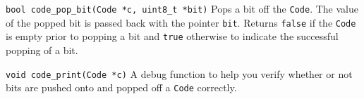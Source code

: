 \begin{funcdoc}{\texttt{bool code\_pop\_bit(Code *c, uint8\_t *bit)}}
  Pops a bit off the \texttt{Code}. The value of the popped bit is
  passed back with the pointer \texttt{bit}. Returns \texttt{false} if
  the \texttt{Code} is empty prior to popping a bit and \texttt{true}
  otherwise to indicate the successful popping of a bit.
\end{funcdoc}

\begin{funcdoc}{\texttt{void code\_print(Code *c)}}
  A debug function to help you verify whether or not bits are pushed
  onto and popped off a \texttt{Code} correctly.
\end{funcdoc}
